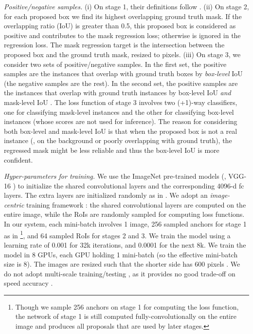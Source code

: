 \documentclass[10pt,twocolumn,letterpaper]{article}
\begin{document}
\vspace{.5em}
\noindent\emph{Positive/negative samples.} (i) On stage 1, their definitions follow \cite{Ren2015}. (ii) On stage 2, for each proposed box we find its highest overlapping ground truth mask. If the overlapping ratio (IoU) is greater than 0.5, this proposed box is considered as positive and contributes to the mask regression loss; otherwise is ignored in the regression loss. The mask regression target is the intersection between the proposed box and the ground truth mask, resized to  pixels. (iii) On stage 3, we consider two sets of positive/negative samples. In the first set, the positive samples are the instances that overlap with ground truth boxes by \emph{box-level} IoU  (the negative samples are the rest). In the second set, the positive samples are the instances that overlap with ground truth instances by box-level IoU  \emph{and} mask-level IoU .
The loss function of stage 3 involves two (+1)-way classifiers, one for classifying mask-level instances and the other for classifying box-level instances (whose scores are not used for inference). 
The reason for considering both box-level and mask-level IoU is that when the proposed box is not a real instance (\eg, on the background or poorly overlapping with ground truth), the regressed mask might be less reliable and thus the box-level IoU is more confident.

\vspace{.5em}
\noindent\emph{Hyper-parameters for training.}
We use the ImageNet pre-trained models (\eg, VGG-16 \cite{Simonyan2015}) to initialize the shared convolutional layers and the corresponding 4096-d fc layers. The extra layers are initialized randomly as in \cite{He2015}. We adopt an \emph{image-centric} training framework \cite{Girshick2015}: the shared convolutional layers are computed on the entire image, while the RoIs are randomly sampled for computing loss functions. In our system, each mini-batch involves 1 image, 256 sampled anchors for stage 1 as in \cite{Ren2015}\footnote{Though we sample 256 anchors on stage 1 for computing the loss function, the network of stage 1 is still computed fully-convolutionally on the entire image and produces all proposals that are used by later stages.}, and 64 sampled RoIs for stages 2 and 3. We train the model using a learning rate of 0.001 for 32k iterations, and 0.0001 for the next 8k. We train the model in 8 GPUs, each GPU holding 1 mini-batch (so the effective mini-batch size is 8). The images are resized such that the shorter side has 600 pixels \cite{Girshick2015}. We do not adopt multi-scale training/testing \cite{He2014,Girshick2015}, as it provides no good trade-off on speed \vs accuracy \cite{Girshick2015}.
\end{document}

